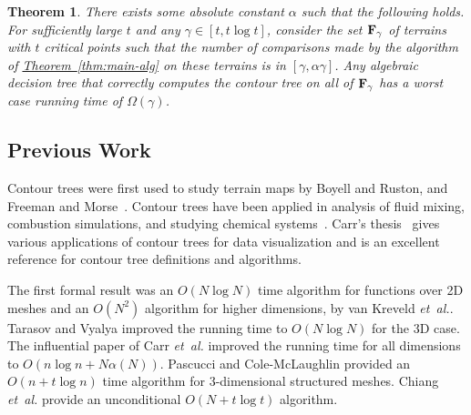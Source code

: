 \documentclass[11pt]{article}
\newcommand{\myparagraph}[1]{\paragraph{#1}}
\newtheorem{theorem}{Theorem}[section]
\theoremstyle{definition}
\newcommand{\bF}{{\bf F}}
\newcommand{\cC}{{\cal C}}
\newcommand{\MM}{\mathbb{M}}
\newcommand{\Thm}[1]{\hyperref[thm:#1]{Theorem~\ref*{thm:#1}}} %
\newcommand{\etal}{\textit{et~al.}\xspace}
\newcommand{\thmConst}{\gamma}
\begin{document}
\begin{theorem} 
\label{thm:main-lb}
There exists some absolute constant $\alpha$ such that the following holds.
For sufficiently large $t$ and any $\thmConst\in [t, t\log t]$, consider the set $\bF_\thmConst$ of terrains with $t$ critical points such that
the number of comparisons made by the algorithm of \Thm{main-alg} on these terrains is in $[\thmConst,\alpha \thmConst]$.
Any algebraic decision tree that correctly computes
the contour tree on all of $\bF_\thmConst$ has a worst case running time of $\Omega(\thmConst)$.
\end{theorem}
% 
% 

\subsection{Previous Work}

Contour trees were first used to study terrain maps by Boyell and Ruston, and Freeman and Morse~\cite{BoRu63,FrMo67}.
Contour trees have been applied in analysis of fluid mixing, combustion simulations,
and studying chemical systems~\cite{LaBe+06,BrWe+10,BeWe+11,BrWe+11,MaGr+11}. Carr's thesis~\cite{c-tmi-04} gives various
applications of contour trees for data visualization and is an excellent reference for contour tree definitions and algorithms.

The first formal result was an $O(N\log N)$ time algorithm for functions over 2D 
meshes and an $O(N^2)$ algorithm for higher dimensions, by van Kreveld \etal \cite{kobps-ctsssit-97}. 
Tarasov and Vyalya \cite{tv-cct-98} improved the running time to $O(N\log N)$ for the 3D case.
The influential paper of Carr \etal \cite{csa-cctad-03} improved the running time for all dimensions to $O(n\log n + N\alpha(N))$.
Pascucci and Cole-McLaughlin \cite{pc-ectls-02} provided an $O(n+t\log n)$ time algorithm for 
$3$-dimensional structured meshes. Chiang \etal \cite{cllr-sooscctmp-05} provide an unconditional $O(N+t\log t)$ algorithm.
\end{document}
